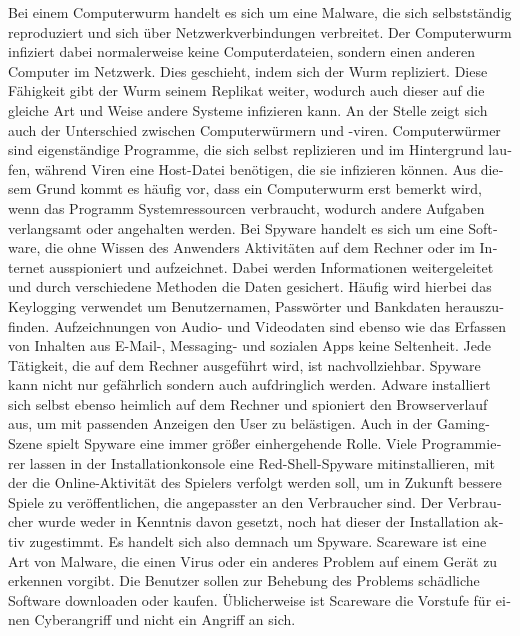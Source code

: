 \begin{otherlanguage}{ngerman}
    \newline Bei einem Computerwurm handelt es sich um eine Malware, die sich selbstständig reproduziert und sich über Netzwerkverbindungen verbreitet.
    Der Computerwurm infiziert dabei normalerweise keine Computerdateien, sondern einen anderen Computer im Netzwerk. Dies geschieht, indem sich der Wurm repliziert. Diese Fähigkeit gibt der Wurm seinem Replikat weiter, wodurch auch dieser auf die gleiche Art und Weise andere Systeme infizieren kann. 
    \newline An der Stelle zeigt sich auch der Unterschied zwischen Computerwürmern und -viren. Computerwürmer sind eigenständige Programme, die sich selbst replizieren und im Hintergrund laufen, während Viren eine Host-Datei benötigen, die sie infizieren können. Aus diesem Grund kommt es häufig vor, dass ein Computerwurm erst bemerkt wird, wenn das Programm Systemressourcen verbraucht, wodurch andere Aufgaben verlangsamt oder angehalten werden.
    \newline Bei Spyware handelt es sich um eine Software, die ohne Wissen des Anwenders Aktivitäten auf dem Rechner oder im Internet ausspioniert und aufzeichnet. 
    Dabei werden Informationen weitergeleitet und durch verschiedene Methoden die Daten gesichert. Häufig wird hierbei das Keylogging verwendet um Benutzernamen, Passwörter und Bankdaten herauszufinden. Aufzeichnungen von Audio- und Videodaten sind ebenso wie das Erfassen von Inhalten aus E-Mail-, Messaging- und sozialen Apps keine Seltenheit. Jede Tätigkeit, die auf dem Rechner ausgeführt wird, ist nachvollziehbar. 
    Spyware kann nicht nur gefährlich sondern auch aufdringlich werden. Adware installiert sich selbst ebenso heimlich auf dem Rechner und spioniert den Browserverlauf aus, um mit passenden Anzeigen den User zu belästigen.
    Auch in der Gaming-Szene spielt Spyware eine immer größer einhergehende Rolle. Viele Programmierer lassen in der Installationkonsole eine Red-Shell-Spyware mitinstallieren, mit der die Online-Aktivität des Spielers verfolgt werden soll, um in Zukunft bessere Spiele zu veröffentlichen, die angepasster an den Verbraucher sind. Der Verbraucher wurde weder in Kenntnis davon gesetzt, noch hat dieser der Installation aktiv zugestimmt.
    Es handelt sich also demnach um Spyware.
    Scareware ist eine Art von Malware, die einen Virus oder ein anderes Problem auf einem Gerät zu erkennen vorgibt. Die Benutzer sollen zur Behebung des Problems schädliche Software downloaden oder kaufen. Üblicherweise ist Scareware die Vorstufe für einen Cyberangriff und nicht ein Angriff an sich.


\end{otherlanguage}
